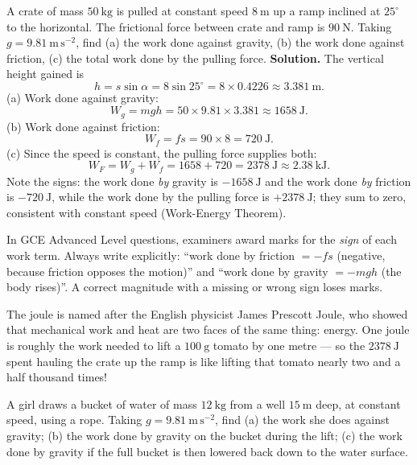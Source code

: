 \documentclass[11pt]{article}
\begin{document}
\begin{exoresolu}
A crate of mass $50\ \mathrm{kg}$ is pulled at constant speed $8\ \mathrm{m}$ up a ramp inclined at $25^\circ$ to the horizontal. The frictional force between crate and ramp is $90\ \mathrm{N}$. Taking $g = 9.81\ \mathrm{m\,s^{-2}}$, find (a) the work done against gravity, (b) the work done against friction, (c) the total work done by the pulling force.
\tcblower
\textbf{Solution.} The vertical height gained is
\[
h = s\sin\alpha = 8\sin 25^\circ = 8 \times 0.4226 \approx 3.381\ \mathrm{m}.
\]
(a) Work done against gravity:
\[
W_g = mgh = 50 \times 9.81 \times 3.381 \approx 1658\ \mathrm{J}.
\]
(b) Work done against friction:
\[
W_f = fs = 90 \times 8 = 720\ \mathrm{J}.
\]
(c) Since the speed is constant, the pulling force supplies both:
\[
W_F = W_g + W_f = 1658 + 720 = 2378\ \mathrm{J} \approx 2.38\ \mathrm{kJ}.
\]
Note the signs: the work done \emph{by} gravity is $-1658\ \mathrm{J}$ and the work done \emph{by} friction is $-720\ \mathrm{J}$, while the work done by the pulling force is $+2378\ \mathrm{J}$; they sum to zero, consistent with constant speed (Work-Energy Theorem).
\end{exoresolu}

\begin{attention}
In GCE Advanced Level questions, examiners award marks for the \emph{sign} of each work term. Always write explicitly: ``work done by friction $= -fs$ (negative, because friction opposes the motion)'' and ``work done by gravity $= -mgh$ (the body rises)''. A correct magnitude with a missing or wrong sign loses marks.
\end{attention}

\begin{savaistu}
The joule is named after the English physicist James Prescott Joule, who showed that mechanical work and heat are two faces of the same thing: energy. One joule is roughly the work needed to lift a $100\ \mathrm{g}$ tomato by one metre --- so the $2378\ \mathrm{J}$ spent hauling the crate up the ramp is like lifting that tomato nearly two and a half thousand times!
\end{savaistu}

\begin{exercice}
A girl draws a bucket of water of mass $12\ \mathrm{kg}$ from a well $15\ \mathrm{m}$ deep, at constant speed, using a rope. Taking $g = 9.81\ \mathrm{m\,s^{-2}}$, find (a) the work she does against gravity; (b) the work done by gravity on the bucket during the lift; (c) the work done by gravity if the full bucket is then lowered back down to the water surface.
\end{exercice}
\end{document}
